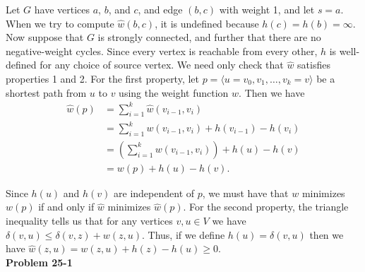 \documentclass{article}
\begin{document}
Let $G$ have vertices $a$, $b$, and $c$, and edge $(b,c)$ with weight 1, and let $s = a$.  When we try to compute $\hat{w}(b,c)$, it is undefined because $h(c) = h(b) = \infty$.  Now suppose that $G$ is strongly connected, and further that there are no negative-weight cycles.  Since every vertex is reachable from every other, $h$ is well-defined for any choice of source vertex.  We need only check that $\hat{w}$ satisfies properties 1 and 2.  For the first property, let $p = \langle u= v_0, v_1, \ldots, v_k = v \rangle$ be a shortest path from $u$ to $v$ using the weight function $w$.  Then we have
\begin{align*}
\hat{w}(p) &= \sum_{i=1}^k \hat{w}(v_{i-1}, v_i) \\
&=\sum_{i=1}^k w(v_{i-1}, v_i) + h(v_{i-1}) - h(v_i) \\
&= \left(\sum_{i=1}^k w(v_{i-1}, v_i)\right) + h(u) - h(v) \\
&= w(p) + h(u) - h(v).
\end{align*}

Since $h(u)$ and $h(v)$ are independent of $p$, we must have that $w$ minimizes $w(p)$ if and only if $\hat{w}$ minimizes $\hat{w}(p)$. For the second property, the triangle inequality tells us that for any vertices $v,u \in V$ we have $\delta(v,u) \leq \delta(v,z) + w(z,u)$.  Thus, if we define $h(u) = \delta(v,u)$ then we have $\hat{w}(z,u) = w(z,u) + h(z) - h(u) \geq 0$.\\


\noindent\textbf{Problem 25-1}\\
\end{document}
